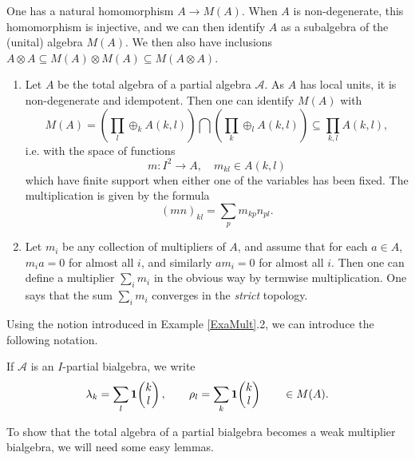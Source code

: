 One has a natural homomorphism $A\rightarrow M(A)$. When $A$ is non-degenerate,  this homomorphism is injective, and we can then identify $A$ as a subalgebra of the (unital) algebra $M(A)$. We then also have inclusions $A\otimes A\subseteq M(A)\otimes M(A)\subseteq M(A\otimes A)$.

\begin{Exa}\label{ExaMult} \begin{enumerate}
\item Let $A$ be the total algebra of a partial algebra $\mathscr{A}$. As $A$ has local units, it is non-degenerate and idempotent. Then one can identify $M(A)$ with \[M(A) = \left(\prod_l \oplus_k A(k,l)\right) \bigcap \left(\prod_k\oplus_l A(k,l)\right) \subseteq \prod_{k,l} A(k,l),\] i.e. with the space of functions \[m:I^2\rightarrow A,\quad m_{kl}\in A(k,l)\] which have finite support when either one of the variables has been fixed. The multiplication is given by the formula \[(mn)_{kl} = \sum_p m_{kp}n_{pl}.\]
\item Let $m_i$ be any collection of multipliers of $A$, and assume that for each $a\in A$, $m_ia =0$ for almost all $i$, and similarly $am_i=0$ for almost all $i$. Then one can define a multiplier $\sum_i m_i$ in the obvious way by termwise multiplication. One says that the sum $\sum_i m_i$ converges in the \emph{strict} topology. 
\end{enumerate}
\end{Exa}

Using the notion introduced in Example \ref{ExaMult}.2, we can introduce the following notation.

\begin{Not}
If $\mathscr{A}$ is an $I$-partial bialgebra, we write \[\lambda_k = \sum_l \mathbf{1}\!\begin{pmatrix} k \\ l\end{pmatrix},\qquad \rho_l = \sum_k\mathbf{1}\!\begin{pmatrix} k \\ l\end{pmatrix} \qquad \in M(A).\]
\end{Not}

To show that the total algebra of a partial bialgebra becomes a weak multiplier bialgebra, we will need some easy lemmas. 

